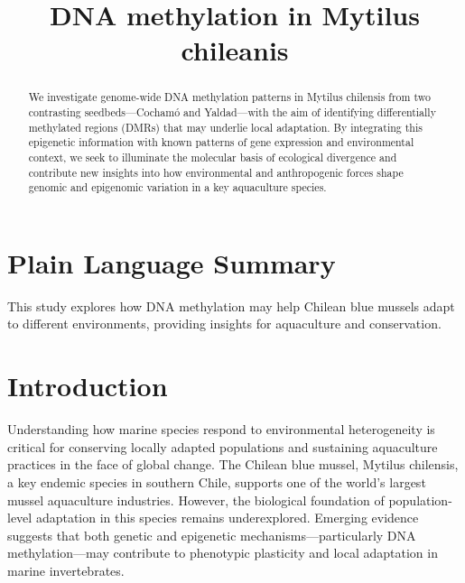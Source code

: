 \documentclass[
]{agujournal2019}
\begin{document}
\title{DNA methylation in Mytilus chileanis}



\begin{abstract}
We investigate genome-wide DNA methylation patterns in Mytilus chilensis
from two contrasting seedbeds---Cochamó and Yaldad---with the aim of
identifying differentially methylated regions (DMRs) that may underlie
local adaptation. By integrating this epigenetic information with known
patterns of gene expression and environmental context, we seek to
illuminate the molecular basis of ecological divergence and contribute
new insights into how environmental and anthropogenic forces shape
genomic and epigenomic variation in a key aquaculture species.
\end{abstract}

\section*{Plain Language Summary}
This study explores how DNA methylation may help Chilean blue mussels
adapt to different environments, providing insights for aquaculture and
conservation.




\section{Introduction}\label{introduction}

Understanding how marine species respond to environmental heterogeneity
is critical for conserving locally adapted populations and sustaining
aquaculture practices in the face of global change. The Chilean blue
mussel, Mytilus chilensis, a key endemic species in southern Chile,
supports one of the world's largest mussel aquaculture industries.
However, the biological foundation of population-level adaptation in
this species remains underexplored. Emerging evidence suggests that both
genetic and epigenetic mechanisms---particularly DNA methylation---may
contribute to phenotypic plasticity and local adaptation in marine
invertebrates.
\end{document}

